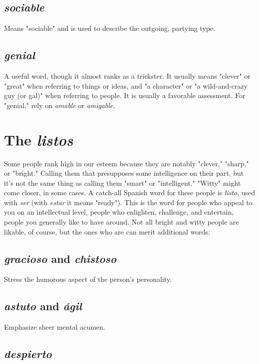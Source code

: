 \documentclass[14pt,a4paper,oneside]{memoir}
\begin{document}
\subsection{\emph{sociable}}

Means "sociable" and is used to describe the outgoing, partying type.

\subsection{\emph{genial}}

A useful word, though it almost ranks as a trickster.
It usually means "clever" or "great" when referring to things or ideas,
and "a character" or "a wild-and-crazy guy (or gal)" when referring to
people. It is usually a favorable assessment. For "genial," rely on \emph{amable} or \emph{amigable}.

\section{The \emph{listos}}

Some people rank high in our esteem because they are notably
"clever," "sharp," or "bright." Calling them that presupposes some intelligence on their part, but it's not the same thing as calling them
"smart" or "intelligent." "Witty" might come closer, in some cases. A
catch-all Spanish word for these people is \emph{listo}, used with \emph{ser} (with \emph{estar} it means "ready"). This is the word for people who appeal to you on
an intellectual level, people who enlighten, challenge, and entertain,
people you generally like to have around.
Not all bright and witty people are likable, of course, but the
ones who are can merit additional words:

\subsection{\emph{gracioso} and \emph{chistoso}}

Stress the humorous aspect of the
person's personality.

\subsection{\emph{astuto} and \emph{ágil}}

Emphasize sheer mental acumen.

\subsection{\emph{despierto}}
\end{document}
